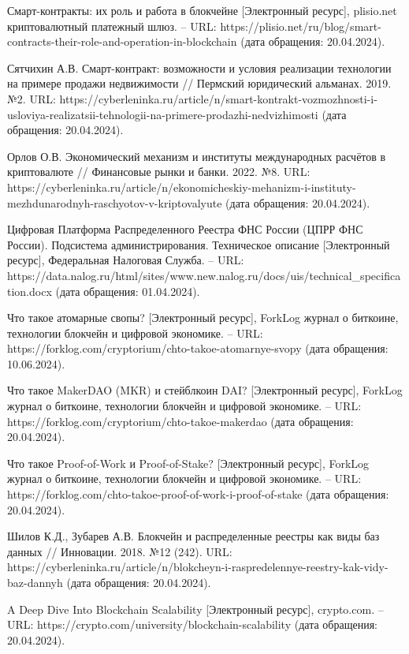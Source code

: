 \begin{thebibliography}{00}
 Смарт-контракты: их роль и работа в блокчейне [Электронный ресурс], plisio.net криптовалютный платежный шлюз. -- URL: https://plisio.net/ru/blog/smart-contracts-their-role-and-operation-in-blockchain (дата обращения: 20.04.2024).

 Сятчихин А.В. Смарт-контракт: возможности и условия реализации технологии на примере продажи недвижимости // Пермский юридический альманах. 2019. №2. URL: https://cyberleninka.ru/article/n/smart-kontrakt-vozmozhnosti-i-usloviya-realizatsii-tehnologii-na-primere-prodazhi-nedvizhimosti (дата обращения: 20.04.2024).

 Орлов О.В. Экономический механизм и институты международных расчётов в криптовалюте // Финансовые рынки и банки. 2022. №8. URL: https://cyberleninka.ru/article/n/ekonomicheskiy-mehanizm-i-instituty-mezhdunarodnyh-raschyotov-v-kriptovalyute (дата обращения: 20.04.2024).

 Цифровая Платформа Распределенного Реестра ФНС России (ЦПРР ФНС России). Подсистема администрирования. Техническое описание [Электронный ресурс], Федеральная Налоговая Служба. -- URL: https://data.nalog.ru/html/sites/www.new.nalog.ru/docs/uis/technical\_specification.docx  (дата обращения: 01.04.2024).

 Что такое атомарные свопы? [Электронный ресурс], ForkLog журнал о биткоине, технологии блокчейн и цифровой экономике. -- URL: https://forklog.com/cryptorium/chto-takoe-atomarnye-svopy (дата обращения: 10.06.2024).

 Что такое MakerDAO (MKR) и стейблкоин DAI? [Электронный ресурс], ForkLog журнал о биткоине, технологии блокчейн и цифровой экономике. -- URL: https://forklog.com/cryptorium/chto-takoe-makerdao (дата обращения: 20.04.2024).

 Что такое Proof-of-Work и Proof-of-Stake? [Электронный ресурс], ForkLog журнал о биткоине, технологии блокчейн и цифровой экономике. -- URL: https://forklog.com/chto-takoe-proof-of-work-i-proof-of-stake (дата обращения: 20.04.2024).

 Шилов К.Д., Зубарев А.В. Блокчейн и распределенные реестры как виды баз данных // Инновации. 2018. №12 (242). URL: https://cyberleninka.ru/article/n/blokcheyn-i-raspredelennye-reestry-kak-vidy-baz-dannyh (дата обращения: 20.04.2024).

 A Deep Dive Into Blockchain Scalability [Электронный ресурс], crypto.com. -- URL: https://crypto.com/university/blockchain-scalability (дата обращения: 20.04.2024).


\end{thebibliography}
